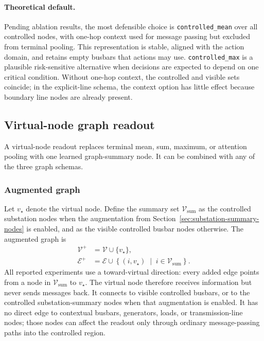 {\paragraph{Theoretical default.}
Pending ablation results, the most defensible choice is
\texttt{controlled\_mean} over all controlled nodes, with one-hop context used
for message passing but excluded from terminal pooling. This representation is
stable, aligned with the action domain, and retains empty busbars that actions
may use. \texttt{controlled\_max} is a plausible risk-sensitive alternative
when decisions are expected to depend on one critical condition. Without
one-hop context, the controlled and visible sets coincide; in the explicit-line
schema, the context option has little effect because boundary line nodes are
already present.
}

\subsection{Virtual-node graph readout}
\label{sec:virtual-node-readout}

A virtual-node readout replaces terminal mean, sum, maximum, or attention
pooling with one learned graph-summary node. It can be combined with any of the
three graph schemas.

\subsubsection{Augmented graph}
\label{subsec:virtual-node-augmented-graph}

Let $v_{\star}$ denote the virtual node. Define the summary set
$\mathcal{V}_{\mathrm{sum}}$ as the controlled substation nodes when the
augmentation from Section~\ref{sec:substation-summary-nodes} is enabled, and as
the visible controlled busbar nodes otherwise. The augmented graph is
\begin{align}
  \mathcal{V}^{+} &= \mathcal{V}\cup\{v_{\star}\}, \\
  \mathcal{E}^{+} &= \mathcal{E}\cup
  \left\{
    (i,v_{\star})
    \;\middle|\;
    i\in\mathcal{V}_{\mathrm{sum}}
  \right\}.
  \label{eq:virtual-node-augmentation}
\end{align}
All reported experiments use a toward-virtual direction: every added edge
points from a node in $\mathcal{V}_{\mathrm{sum}}$ to $v_{\star}$. The virtual
node therefore receives information but never sends messages back. It connects
to visible controlled busbars, or to the controlled substation-summary nodes
when that augmentation is enabled. It has no direct edge to contextual
busbars, generators, loads, or transmission-line nodes; those nodes can affect
the readout only through ordinary message-passing paths into the controlled
region.

